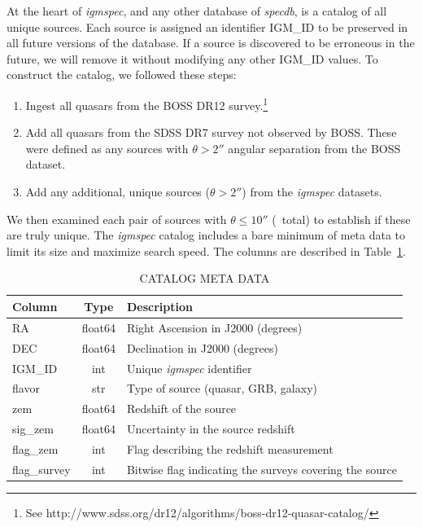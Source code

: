 \documentclass[12pt]{elsarticle}
\begin{document}
At the heart of {\it igmspec}, and any other database  
of {\it specdb}, is a catalog of all unique sources.
Each source is assigned an identifier IGM\_ID to be
preserved in all future versions of the database.
If a source is discovered to be erroneous in the future, 
we will remove it without modifying
any other IGM\_ID values.
To construct the catalog, we followed these steps:

\begin{enumerate}
\item Ingest all quasars from the BOSS DR12 survey.\footnote{See
http://www.sdss.org/dr12/algorithms/boss-dr12-quasar-catalog/}
\item Add all quasars from the SDSS DR7 survey not observed by BOSS.
These were defined as any sources with $\theta > 2''$ angular separation
from the BOSS dataset.
\item Add any additional, unique sources ($\theta > 2''$)
from the {\it igmspec} datasets.
\end{enumerate}
We then examined each pair of sources with $\theta \le 10''$ 
(\npair\ total) to establish if these are truly unique.
The {\it igmspec} catalog includes a bare minimum of meta data
to limit its size and maximize search speed.
The columns are described in Table~\ref{tab:cat_keys}.

 
\begin{table}
\caption{CATALOG META DATA\label{tab:cat_keys}}
\footnotesize
\begin{tabular}{lcl}
Column & Type  & Description \\
\hline
RA           & float64 & Right Ascension in J2000 (degrees) \\
DEC          & float64 & Declination in J2000 (degrees) \\
IGM\_ID      & int     & Unique {\it igmspec} identifier \\
flavor       & str     & Type of source (quasar, GRB, galaxy) \\
zem          & float64 & Redshift of the source \\
sig\_zem     & float64 & Uncertainty in the source redshift \\
flag\_zem    & int     & Flag describing the redshift measurement \\
flag\_survey & int     & Bitwise flag indicating the surveys covering the source \\
\hline
\end{tabular}
\end{table}
\end{document}
